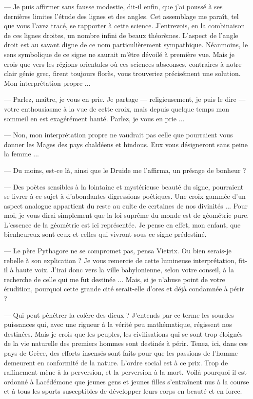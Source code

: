 \documentclass[a4paper, 11pt, oneside, polutonikogreek, french]{article}
\begin{document}
--- Je puis affirmer sans fausse modestie, dit-il enfin, que j'ai poussé à ses dernières limites l'étude des lignes et des angles. Cet assemblage me paraît, tel que vous l'avez tracé, se rapporter à cette science. J'entrevois, en la combinaison de ces lignes droites, un nombre infini de beaux théorèmes. L'aspect de l'angle droit est au savant digne de ce nom particulièrement sympathique. Néanmoins, le sens symbolique de ce signe ne saurait m'être dévoilé à première vue. Mais je crois que vers les régions orientales où ces sciences absconses, contraires à notre clair génie grec, firent toujours florès, vous trouveriez précisément une solution. Mon interprétation propre ...

--- Parlez, maître, je vous en prie. Je partage --- religieusement, je puis le dire --- votre enthousiasme à la vue de cette croix, mais depuis quelque temps mon sommeil en est exagérément hanté. Parlez, je vous en prie ...

--- Non, mon interprétation propre ne vaudrait pas celle que pourraient vous donner les Mages des pays chaldéens et hindous. Eux vous désigneront sans peine la femme ...

--- Du moins, est-ce là, ainsi que le Druide me l'affirma, un présage de bonheur ?

--- Des poètes sensibles à la lointaine et mystérieuse beauté du signe, pourraient se livrer à ce sujet à d'abondantes digressions poétiques. Une croix gammée d'un aspect analogue appartient du reste au culte de certaines de nos divinités ... Pour moi, je vous dirai simplement que la loi suprême du monde est de géométrie pure. L'essence de la géométrie est ici représentée. Je pense en effet, mon enfant, que bienheureux sont ceux et celles qui vivront sous ce signe prédestiné.

\bigskip
\centerline{\EightStarTaper}
\centerline{\EightStarTaper\EightStarTaper}
\bigskip

--- Le père Pythagore ne se compromet pas, pensa Vietrix. Ou bien serais-je rebelle à son explication ? Je vous remercie de cette lumineuse interprétation, fit-il à haute voix. J'irai donc vers la ville babylonienne, selon votre conseil, à la recherche de celle qui me fut destinée ... Mais, si je n'abuse point de votre érudition, pourquoi cette grande cité serait-elle d'ores et déjà condamnée à périr ?

--- Qui peut pénétrer la colère des dieux ? J'entends par ce terme les sourdes puissances qui, avec une rigueur à la vérité peu mathématique, régissent nos destinées. Mais je crois que les peuples, les civilisations qui se sont trop éloignés de la vie naturelle des premiers hommes sont destinés à périr. Tenez, ici, dans ces pays de Grèce, des efforts insensés sont faits pour que les passions de l'homme demeurent en conformité de la nature. L'ordre social est à ce prix. Trop de raffinement mène à la perversion, et la perversion à la mort. Voilà pourquoi il est ordonné à Lacédémone que jeunes gens et jeunes filles s'entraînent nus à la course et à tous les sports susceptibles de développer leurs corps en beauté et en force.
\end{document}
